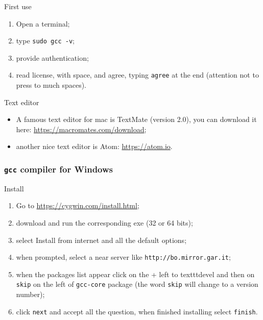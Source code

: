 \begin{frame}
    \begin{block}{First use}
    \begin{enumerate}
    \item Open a terminal;
    \item type \alert{\texttt{sudo gcc -v}};
    \item provide authentication;
    \item read license, with \alert{space}, and agree, typing
      \alert{\texttt{agree}} at the end (attention not to press to
      much spaces).
    \end{enumerate}
  \end{block}
  \begin{block}{Text editor}
    \begin{itemize}
    \item A famous text editor for mac is \alert{TextMate} (version
      2.0), you can download it here: \url{https://macromates.com/download};
    \item another nice text editor is \alert{Atom}: \url{https://atom.io}.
    \end{itemize}
  \end{block}
\end{frame}

\begin{frame}
  \frametitle{\texttt{gcc} compiler for Windows}
  \begin{block}{Install}
    \begin{enumerate}
    \item Go to \url{https://cygwin.com/install.html};
    \item download and run the corresponding \alert{exe} (32 or 64
      bits);
    \item select \alert{Install from internet} and all the default
      options;
    \item when prompted, select a near server like
      \alert{\texttt{http://bo.mirror.gar.it}};
    \item when the packages list appear click on the + left to
      \alert{texttt{devel}} and then on \alert{\texttt{skip}} on the
      left of \alert{\texttt{gcc-core}} package (the word
      \texttt{skip} will change to a version number);
    \item click \alert{\texttt{next}} and accept all the question,
      when finished installing select \alert{\texttt{finish}}.
    \end{enumerate}
  \end{block}
\end{frame}

